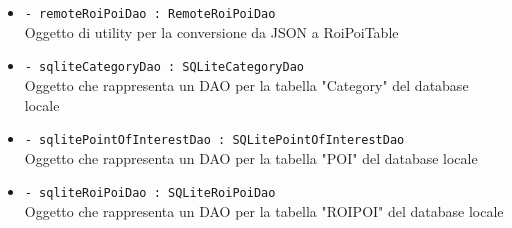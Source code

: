 \documentclass[../DefinizioneDiProdotto.tex]{subfiles}
\begin{document}
\begin{description}
\begin{itemize}
		\item \texttt{- remoteRoiPoiDao : RemoteRoiPoiDao}\\
		Oggetto di utility per la conversione da JSON a RoiPoiTable
		
		\item \texttt{- sqliteCategoryDao : SQLiteCategoryDao}\\
		Oggetto che rappresenta un DAO per la tabella "Category" del database locale
		
		\item \texttt{- sqlitePointOfInterestDao : SQLitePointOfInterestDao}\\
		Oggetto che rappresenta un DAO per la tabella "POI" del database locale
		
		\item \texttt{- sqliteRoiPoiDao : SQLiteRoiPoiDao}\\
		Oggetto che rappresenta un DAO per la tabella "ROIPOI" del database locale
		

\end{itemize}
\end{description}
\end{document}
